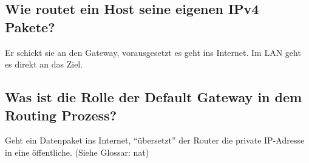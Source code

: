 \subsection*{Wie routet ein Host seine eigenen IPv4 Pakete?}
Er schickt sie an den Gateway, vorausgesetzt es geht ins Internet. Im LAN geht es direkt an das Ziel.

\subsection*{Was ist die Rolle der Default Gateway in dem Routing Prozess?}
Geht ein Datenpaket ins Internet, "`übersetzt"' der Router die private IP-Adresse in eine öffentliche. (Siehe Glossar: \gls{nat})

